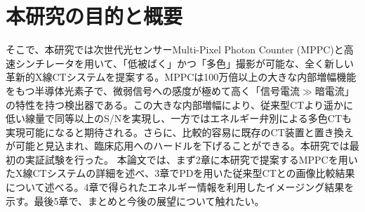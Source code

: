 \section{本研究の目的と概要}
そこで、本研究では次世代光センサーMulti-Pixel Photon Counter (MPPC)と高速シンチレータを用いて、「低被ばく」かつ「多色」撮影が可能な、全く新しい革新的X線CTシステムを提案する。MPPCは100万倍以上の大きな内部増幅機能をもつ半導体光素子で、微弱信号への感度が極めて高く「信号電流$\gg$暗電流」の特性を持つ検出器である。この大きな内部増幅により、従来型CTより遥かに低い線量で同等以上のS/Nを実現し、一方ではエネルギー弁別による多色CTも実現可能になると期待される。さらに、比較的容易に既存のCT装置と置き換えが可能と見込まれ、臨床応用へのハードルを下げることができる。本研究では最初の実証試験を行った。
本論文では、まず2章に本研究で提案するMPPCを用いたX線CTシステムの詳細を述べ、3章でPDを用いた従来型CTとの画像比較結果について述べる。4章で得られたエネルギー情報を利用したイメージング結果を示す。最後5章で、まとめと今後の展望について触れたい。






